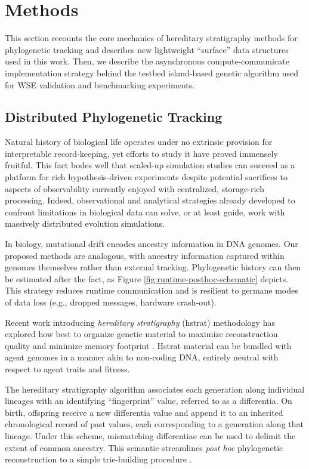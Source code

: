 \section{Methods} \label{sec:methods}



This section recounts the core mechanics of hereditary stratigraphy methods for phylogenetic tracking and describes new lightweight ``surface'' data structures used in this work.
Then, we describe the asynchronous compute-communicate implementation strategy behind the testbed island-based genetic algorithm used for WSE validation and benchmarking experiments.

\subsection{Distributed Phylogenetic Tracking}

Natural history of biological life operates under no extrinsic provision for interpretable record-keeping, yet efforts to study it have proved immensely fruitful.
This fact bodes well that scaled-up simulation studies can succeed as a platform for rich hypothesis-driven experiments despite potential sacrifices to aspects of observability currently enjoyed with centralized, storage-rich processing.
Indeed, observational and analytical strategies already developed to confront limitations in biological data can solve, or at least guide, work with massively distributed evolution simulations.

In biology, mutational drift encodes ancestry information in DNA genomes.
Our proposed methods are analogous, with ancestry information captured within genomes themselves rather than external tracking.
Phylogenetic history can then be estimated after the fact, as Figure \ref{fig:runtime-posthoc-schematic} depicts.
This strategy reduces runtime communication and is resilient to germane modes of data loss (e.g., dropped messages, hardware crash-out).

Recent work introducing \textit{hereditary stratigraphy} (hstrat) methodology has explored how best to organize genetic material to maximize reconstruction quality and minimize memory footprint \citep{moreno2022hstrat, moreno2022hereditary}.
Hstrat material can be bundled with agent genomes in a manner akin to non-coding DNA, entirely neutral with respect to agent traits and fitness.

The hereditary stratigraphy algorithm associates each generation along individual lineages with an identifying ``fingerprint'' value, referred to as a differentia.
On birth, offspring receive a new differentia value and append it to an inherited chronological record of past values, each corresponding to a generation along that lineage.
Under this scheme, mismatching differentiae can be used to delimit the extent of common ancestry.
This semantic streamlines \textit{post hoc} phylogenetic reconstruction to a simple trie-building procedure
\citep{moreno2024analysis}.

